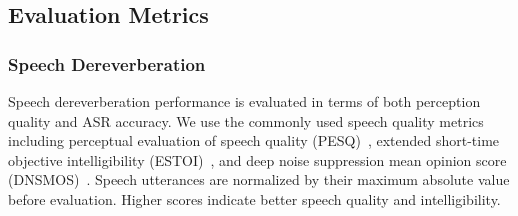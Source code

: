 


\subsection{Evaluation Metrics}
\subsubsection{{Speech Dereverberation}}

Speech dereverberation performance is evaluated in terms of both perception quality and ASR accuracy. 
We use the commonly used speech quality metrics including perceptual evaluation of speech quality (PESQ)~\cite{rix2001perceptual}, extended short-time objective intelligibility (ESTOI)~\cite{jensen2016algorithm}, and
deep noise suppression mean opinion score (DNSMOS)~\cite{reddy2021dnsmos,reddy2022dnsmos}.
Speech utterances are normalized by their maximum absolute value before evaluation. 
Higher scores indicate better speech quality and intelligibility.

